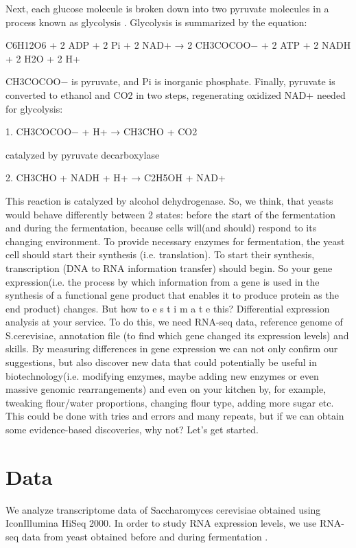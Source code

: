 \documentclass{article}
\begin{document}
 Next, each glucose molecule is broken down into two pyruvate molecules in a process known as glycolysis \cite{2}. Glycolysis is summarized by the equation:
 
 C6H12O6 + 2 ADP + 2 Pi + 2 NAD+ → 2 CH3COCOO− + 2 ATP + 2 NADH \\
 + 2 H2O + 2 H+
 
 CH3COCOO− is pyruvate, and Pi is inorganic phosphate. Finally, pyruvate is converted to ethanol and CO2 in two steps, regenerating oxidized NAD+ needed for glycolysis:
 
 1. CH3COCOO− + H+ → CH3CHO + CO2
 
 catalyzed by pyruvate decarboxylase
 
 2. CH3CHO + NADH + H+ → C2H5OH + NAD+
 
 This reaction is catalyzed by alcohol dehydrogenase.
 So, we think, that yeasts would behave differently between 2 states: before the start of the fermentation and during the fermentation, because cells will(and should) respond to its changing environment. To provide necessary enzymes for fermentation, the yeast cell should start their synthesis (i.e. translation). To start their synthesis, transcription (DNA to RNA information transfer) should begin. So your gene expression(i.e. the process by which information from a gene is used in the synthesis of a functional gene product that enables it to produce protein as the end product\cite{3}) changes. But how to e s t i m a t e this? Differential expression analysis at your service. To do this, we need RNA-seq data, reference genome of S.cerevisiae, annotation file (to find which gene changed its expression levels) and skills. By measuring differences in gene expression we can not only confirm our suggestions, but also discover new data that could potentially be useful in biotechnology(i.e. modifying enzymes, maybe adding new enzymes or even massive genomic rearrangements) and even on your kitchen by, for example, tweaking flour/water proportions, changing flour type, adding more sugar etc. This could be done with tries and errors and many repeats, but if we can obtain some evidence-based discoveries, why not?
 Let's get started.
 
 
 \section{Data}
We analyze transcriptome data of Saccharomyces cerevisiae
obtained using IconIllumina HiSeq 2000.   In order to study RNA expression levels, we use RNA-seq data from yeast obtained before and during fermentation \cite{data}. 
\end{document}

